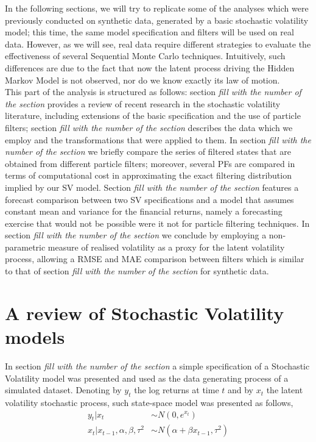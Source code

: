 \documentclass[
]{book}
\theoremstyle{break}
\theoremstyle{nonumberplain}
\begin{document}
In the following sections, we will try to replicate some of the analyses
which were previously conducted on synthetic data, generated by a basic
stochastic volatility model; this time, the same model specification and
filters will be used on real data. However, as we will see, real data
require different strategies to evaluate the effectiveness of several
Sequential Monte Carlo techniques. Intuitively, such differences are due
to the fact that now the latent process driving the Hidden Markov Model
is not observed, nor do we know exactly its law of motion.\\
This part of the analysis is structured as follows: section
\textit{fill with the number of the section} provides a review of recent
research in the stochastic volatility literature, including extensions
of the basic specification and the use of particle filters; section
\textit{fill with the number of the section} describes the data which we
employ and the transformations that were applied to them. In section
\textit{fill with the number of the section} we briefly compare the
series of filtered states that are obtained from different particle
filters; moreover, several PFs are compared in terms of computational
cost in approximating the exact filtering distribution implied by our SV
model. Section \textit{fill with the number of the section} features a
forecast comparison between two SV specifications and a model that
assumes constant mean and variance for the financial returns, namely a
forecasting exercise that would not be possible were it not for particle
filtering techniques. In section
\textit{fill with the number of the section} we conclude by employing a
non-parametric measure of realised volatility as a proxy for the latent
volatility process, allowing a RMSE and MAE comparison between filters
which is similar to that of section
\textit{fill with the number of the section} for synthetic data.

\section{A review of Stochastic Volatility models}

In section \textit{fill with the number of the section} a simple
specification of a Stochastic Volatility model was presented and used as
the data generating process of a simulated dataset. Denoting by \(y_t\)
the log returns at time \(t\) and by \(x_t\) the latent volatility
stochastic process, such state-space model was presented as follows,
\begin{align*}
    y_t|x_t & \sim N(0,e^{x_t})\\
    x_t|x_{t-1},\alpha,\beta,\tau^2 & \sim N(\alpha+\beta x_{t-1},\tau^2)
\end{align*}
\end{document}
